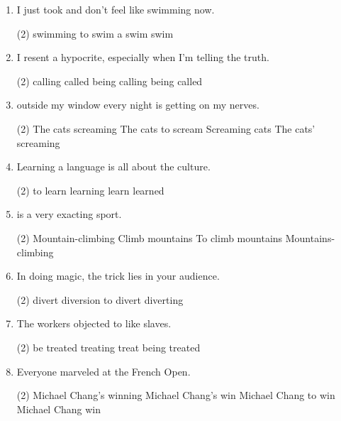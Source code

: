 \begin{enumerate}
\item I just took \ttu and don't feel like swimming now.
  \begin{tasks}(2)
    \task swimming
    \task to swim
    \task a swim
    \task swim
  \end{tasks}

\item I resent \ttu a hypocrite, especially when I'm telling the truth.
  \begin{tasks}(2)
    \task calling
    \task called
    \task being calling
    \task being called
  \end{tasks}

\item \ttu outside my window every night is getting on my nerves.
  \begin{tasks}(2)
    \task The cats screaming
    \task The cats to scream
    \task Screaming cats
    \task The cats' screaming
  \end{tasks}

\item Learning a language is \ttu all about the culture.
  \begin{tasks}(2)
    \task to learn
    \task learning
    \task learn
    \task learned
  \end{tasks}

\item \ttu is a very exacting sport.
  \begin{tasks}(2)
    \task Mountain-climbing
    \task Climb mountains
    \task To climb mountains
    \task Mountains-climbing
  \end{tasks}

\item In doing magic, the trick lies in \ttu your audience.
  \begin{tasks}(2)
    \task divert
    \task diversion
    \task to divert
    \task diverting
  \end{tasks}

\item The workers objected to \ttu like slaves.
  \begin{tasks}(2)
    \task be treated
    \task treating
    \task treat
    \task being treated
  \end{tasks}

\item Everyone marveled at \ttu the French Open.
  \begin{tasks}(2)
    \task Michael Chang's winning
    \task Michael Chang's win
    \task Michael Chang to win
    \task Michael Chang win
  \end{tasks}


\end{enumerate}
